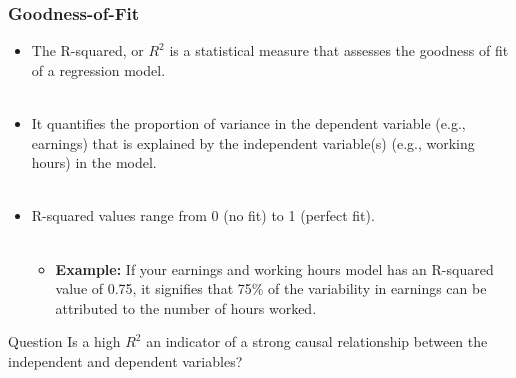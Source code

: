 \documentclass[notes,10pt, aspectratio=169]{beamer}
\begin{document}
\begin{frame}
\frametitle{Goodness-of-Fit}
\begin{itemize}
    \item  The R-squared, or $R^2$ is a statistical measure that assesses the goodness of fit of a regression model.\\\\[1em]
    \item It quantifies the proportion of variance in the dependent variable (e.g., earnings) that is explained by the independent variable(s) (e.g., working hours) in the model.\\\\[1em]
    \item R-squared values range from 0 (no fit) to 1 (perfect fit).\\\\[1em]
    \begin{itemize}
        \item \textbf{Example:} If your earnings and working hours model has an R-squared value of 0.75, it signifies that 75\% of the variability in earnings can be attributed to the number of hours worked.
    \end{itemize}
\end{itemize}

\begin{exampleblock}{Question}
Is a high $R^2$ an indicator of a strong causal relationship between the independent and dependent variables?
\end{exampleblock}

\end{frame}
\end{document}

